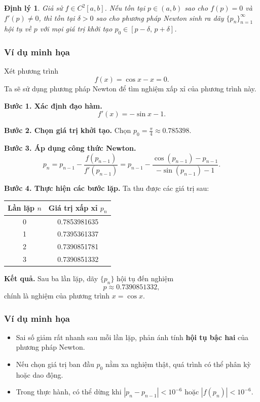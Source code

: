 \newtheorem{theorem}{Định lý}
\begin{theorem}
Giả sử $f \in C^2[a, b]$. 
Nếu tồn tại $p \in (a, b)$ sao cho $f(p) = 0$ và $f'(p) \neq 0$, 
thì tồn tại $\delta > 0$ sao cho phương pháp Newton sinh ra dãy 
$\{p_n\}_{n=1}^{\infty}$ hội tụ về $p$ với mọi giá trị khởi tạo 
$p_0 \in [p - \delta,\, p + \delta]$.
\end{theorem}

\subsubsection*{Ví dụ minh họa}

Xét phương trình
\[
    f(x) = \cos x - x = 0.
\]
Ta sẽ sử dụng phương pháp Newton để tìm nghiệm xấp xỉ của phương trình này.

\textbf{Bước 1. Xác định đạo hàm.}
\[
    f'(x) = -\sin x - 1.
\]

\textbf{Bước 2. Chọn giá trị khởi tạo.}
Chọn $p_0 = \frac{\pi}{4} \approx 0.785398$.

\textbf{Bước 3. Áp dụng công thức Newton.}
\[
    p_{n} = p_{n-1} - \frac{f(p_{n-1})}{f'(p_{n-1})} 
           = p_{n-1} - \frac{\cos(p_{n-1}) - p_{n-1}}{-\sin(p_{n-1}) - 1}.
\]

\textbf{Bước 4. Thực hiện các bước lặp.}
Ta thu được các giá trị sau:

\begin{center}
\begin{tabular}{|c|c|}
\hline
\textbf{Lần lặp} $n$ & \textbf{Giá trị xấp xỉ} $p_n$ \\
\hline
0 & 0.7853981635 \\
1 & 0.7395361337 \\
2 & 0.7390851781 \\
3 & 0.7390851332 \\
\hline
\end{tabular}
\end{center}

\textbf{Kết quả.}
Sau ba lần lặp, dãy $\{p_n\}$ hội tụ đến nghiệm
\[
    p \approx 0.7390851332,
\]
chính là nghiệm của phương trình $x = \cos x$.

\subsubsection*{Ví dụ minh họa}
\begin{itemize}
    \item Sai số giảm rất nhanh sau mỗi lần lặp, phản ánh tính \textbf{hội tụ bậc hai} của phương pháp Newton.
    \item Nếu chọn giá trị ban đầu $p_0$ nằm xa nghiệm thật, quá trình có thể phân kỳ hoặc dao động.
    \item Trong thực hành, có thể dừng khi $|p_{n} - p_{n-1}| < 10^{-6}$ hoặc $|f(p_n)| < 10^{-6}$.
\end{itemize}

